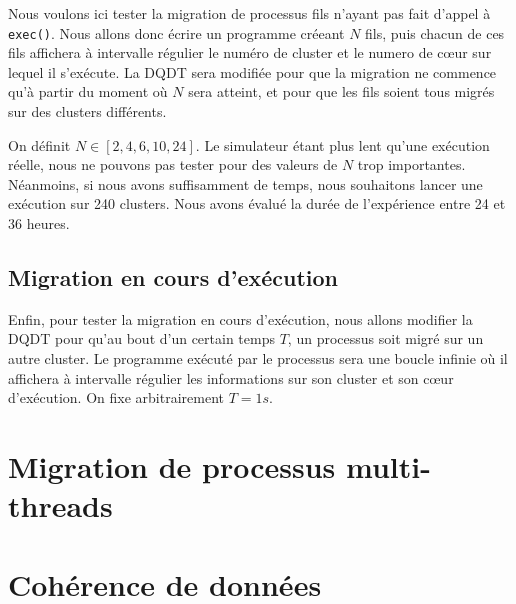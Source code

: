       Nous voulons ici tester la migration de processus fils n'ayant pas fait
      d'appel à \texttt{exec()}. Nous allons donc écrire un programme créeant
      $N$ fils, puis chacun de ces fils affichera à intervalle régulier le
      numéro de cluster et le numero de c\oe ur sur lequel il s'exécute. La DQDT
      sera modifiée pour que la migration ne commence qu'à partir du moment où
      $N$ sera atteint, et pour que les fils soient tous migrés sur des clusters
      différents.

      On définit $N \in [2, 4, 6, 10, 24]$. Le simulateur étant plus lent qu'une
      exécution réelle, nous ne pouvons pas tester pour des valeurs de $N$ trop
      importantes. Néanmoins, si nous avons suffisamment de temps, nous
      souhaitons lancer une exécution sur 240 clusters. Nous avons évalué la
      durée de l'expérience entre 24 et 36 heures.

    \subsection{Migration en cours d'exécution}

      Enfin, pour tester la migration en cours d'exécution, nous allons modifier
      la DQDT pour qu'au bout d'un certain temps $T$, un processus soit migré
      sur un autre cluster. Le programme exécuté par le processus sera une
      boucle infinie où il affichera à intervalle régulier les informations sur
      son cluster et son c\oe ur d'exécution. On fixe arbitrairement $T = 1s$.

  \section{Migration de processus multi-threads}

      \todo{}

  \section{Cohérence de données}

